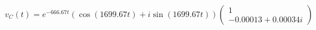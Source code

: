 \documentclass[preview]{standalone}
\begin{document}
\begin{center}
\[
                                v_C(t) = e^{-666.67t} \left( \cos(1699.67t) + i \sin(1699.67t) \right)
                                \begin{pmatrix} 
                                1 \\ 
                                -0.00013 + 0.00034i 
                                \end{pmatrix}
                                \]
\end{center}
\end{document}
